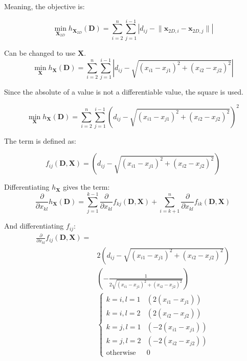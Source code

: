 \documentclass[a4paper,12pt]{article}
\begin{document}
Meaning, the objective is:

\begin{equation}
    \min_{\bm{X}_{2D}}\limits h_{\bm{X}_{2D}}(\bm{D}) = \sum_{i=2}^{n} \sum_{j=1}^{i-1} \left|d_{ij} - \lVert \bm{x}_{2D,i} - \bm{x}_{2D,j} \rVert \right|
\end{equation}

Can be changed to use $\bm{X}$.
\begin{equation}
    \min_{\bm{X}}\limits h_{\bm{X}}(\bm{D}) = \sum_{i=2}^{n} \sum_{j=1}^{i-1} \left|d_{ij} - \sqrt{(x_{i1} - x_{j1})^2 + (x_{i2} - x_{j2})^2} \right|
\end{equation}

Since the absolute of a value is not a differentiable value, the square is used.

\begin{equation}
    \min_{\bm{X}}\limits h_{\bm{X}}(\bm{D}) = \sum_{i=2}^{n} \sum_{j=1}^{i-1} \left(d_{ij} - \sqrt{(x_{i1} - x_{j1})^2 + (x_{i2} - x_{j2})^2} \right)^2
\end{equation}

The term is defined as:

\begin{equation}
    f_{ij}(\bm{D}, \bm{X}) = \left(d_{ij} - \sqrt{(x_{i1} - x_{j1})^2 + (x_{i2} - x_{j2})^2} \right)
\end{equation}

Differentiating $h_{\bm{X}}$ gives the term:
\begin{equation}
    \frac{\partial}{\partial x_{kl}} h_{\bm{X}}(\bm{D}) = \sum_{j=1}^{k-1} \frac{\partial}{\partial x_{kl}}f_{kj}(\bm{D}, \bm{X}) +  \sum_{i=k+1}^{n} \frac{\partial}{\partial x_{kl}}f_{ik}(\bm{D}, \bm{X})
\end{equation}

And differentiating $f_{ij}$:
\begin{equation}
\begin{aligned}
    \frac{\partial}{\partial x_{kl}} f_{ij}(\bm{D}, \bm{X}) = 
    \\ & 2\left(d_{ij} - \sqrt{(x_{i1} - x_{j1})^2 + (x_{i2} - x_{j2})^2} \right)
    \\ & \left(-\frac{1}{2\sqrt{(x_{i1} - x_{j1})^2 + (x_{i2} - x_{j2})^2}} \right) 
    \\ &\begin{cases}
        k=i,l=1 & \left(2(x_{i1} - x_{j1})\right)\\
        k=i,l=2 & \left(2(x_{i2} - x_{j2})\right)\\
        k=j,l=1 & \left(-2(x_{i1} - x_{j1})\right)\\
        k=j,l=2 & \left(-2(x_{i2} - x_{j2})\right)\\
        \text{otherwise} & 0
    \end{cases}
\end{aligned}
\end{equation}
\end{document}
